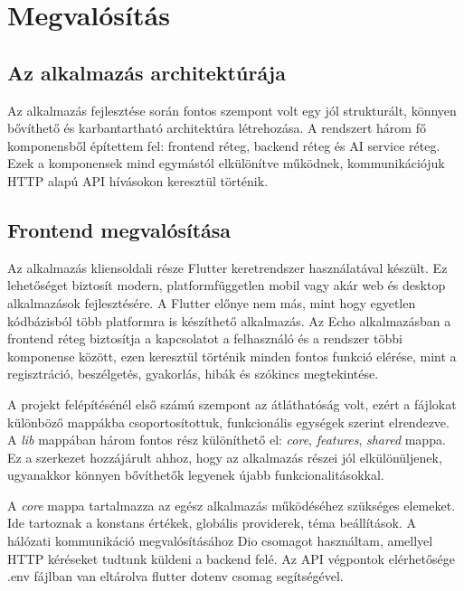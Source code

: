 \chapter{Megvalósítás}

\section{Az alkalmazás architektúrája}
Az alkalmazás fejlesztése során fontos szempont volt egy jól strukturált, könnyen bővíthető és karbantartható architektúra létrehozása. A rendszert három fő komponensből építettem fel: frontend réteg, backend réteg és AI service réteg. Ezek a komponensek mind egymástól elkülönítve működnek, kommunikációjuk HTTP alapú API hívásokon keresztül történik.



\section{Frontend megvalósítása}

Az alkalmazás kliensoldali része Flutter keretrendszer használatával készült. \cite{flutter} Ez lehetőséget biztosít modern, platformfüggetlen mobil vagy akár web és desktop alkalmazások fejlesztésére. A Flutter előnye nem más, mint hogy egyetlen kódbázisból több platformra is készíthető alkalmazás. Az Echo alkalmazásban a frontend réteg biztosítja a kapcsolatot a felhasználó és a rendszer többi komponense között, ezen keresztül történik minden fontos funkció elérése, mint a regisztráció, beszélgetés, gyakorlás, hibák és szókincs megtekintése.

A projekt felépítésénél első számú szempont az átláthatóság volt, ezért a fájlokat különböző mappákba csoportosítottuk, funkcionális egységek szerint elrendezve. A \textit{lib} mappában három fontos rész különíthető el: \textit{core}, \textit{features}, \textit{shared} mappa. Ez a szerkezet hozzájárult ahhoz, hogy az alkalmazás részei jól elkülönüljenek, ugyanakkor könnyen bővíthetők legyenek újabb funkcionalitásokkal.

A \textit{core} mappa tartalmazza az egész alkalmazás működéséhez szükséges elemeket. Ide tartoznak a konstans értékek, globális providerek, téma beállítások. A hálózati kommunikáció megvalósításához Dio csomagot  \cite{dio} használtam, amellyel HTTP kéréseket tudtunk küldeni a backend felé. Az API végpontok elérhetősége .env fájlban van eltárolva flutter dotenv csomag segítségével. \cite{flutterdotenv}

